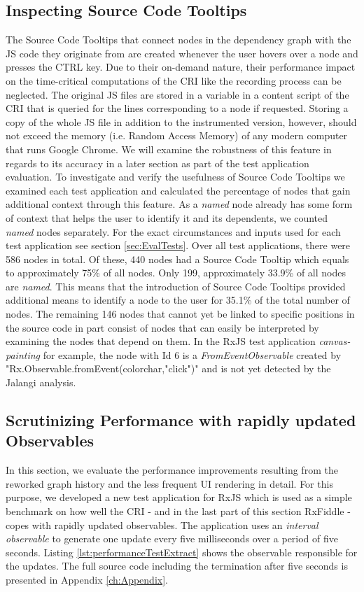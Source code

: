 	\subsection{Inspecting Source Code Tooltips}
	The Source Code Tooltips that connect nodes in the dependency graph with the JS code they originate from are created whenever the user hovers over a node and presses the CTRL key. Due to their on-demand nature, their performance impact on the time-critical computations of the CRI like the recording process can be neglected. The original JS files are stored in a variable in a content script of the CRI that is queried for the lines corresponding to a node if requested. Storing a copy of the whole JS file in addition to the instrumented version, however, should not exceed the memory (i.e. Random Access Memory) of any modern computer that runs Google Chrome. We will examine the robustness of this feature in regards to its accuracy in a later section as part of the test application evaluation. To investigate and verify the usefulness of Source Code Tooltips we examined each test application and calculated the percentage of nodes that gain additional context through this feature. As a \emph{named} node already has some form of context that helps the user to identify it and its dependents, we counted \emph{named} nodes separately. For the exact circumstances and inputs used for each test application see section \ref{sec:EvalTests}. Over all test applications, there were 586 nodes in total. Of these, 440 nodes had a Source Code Tooltip which equals to approximately 75\% of all nodes. Only 199, approximately 33.9\% of all nodes are \emph{named}. This means that the introduction of Source Code Tooltips provided additional means to identify a node to the user for 35.1\% of the total number of nodes. The remaining 146 nodes that cannot yet be linked to specific positions in the source code in part consist of nodes that can easily be interpreted by examining the nodes that depend on them. In the RxJS test application \emph{canvas-painting} for example, the node with Id 6 is a \emph{FromEventObservable} created by "Rx.Observable.fromEvent(colorchar,"click")" and is not yet detected by the Jalangi analysis.

	\subsection{Scrutinizing Performance with rapidly updated Observables}
	\label{sec:PerformanceEvaluation}
	In this section, we evaluate the performance improvements resulting from the reworked graph history and the less frequent UI rendering in detail. For this purpose, we developed a new test application for RxJS which is used as a simple benchmark on how well the CRI - and in the last part of this section RxFiddle - copes with rapidly updated observables. The application uses an \emph{interval observable} to generate one update every five milliseconds over a period of five seconds. Listing \ref{lst:performanceTestExtract} shows the observable responsible for the updates. The full source code including the termination after five seconds is presented in Appendix \ref{ch:Appendix}.
	
